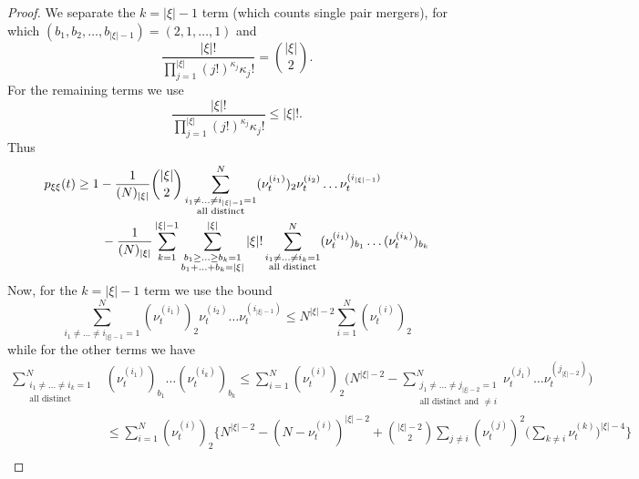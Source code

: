 \begin{proof}
We separate the $k=|\xi|-1$ term (which counts single pair mergers), for which $(b_1, b_2, \dots, b_{|\xi|-1}) = (2,1,\dots,1)$ and
\begin{equation*}
\frac{ | \xi |! }{ \prod_{ j = 1 }^{ | \xi | } ( j ! )^{ \kappa_j } \kappa_j ! }
= \binom{|\xi|}{2} .
\end{equation*}
For the remaining terms we use
\begin{equation*}
\frac{ | \xi |! }{ \prod_{ j = 1 }^{ | \xi | } ( j ! )^{ \kappa_j } \kappa_j ! }
\leq |\xi|! .
\end{equation*}
Thus
\begin{align}
p_{ \xi \xi }( t ) 
&\geq 1 - \frac{ 1 }{ ( N )_{ | \xi | } } \binom{|\xi|}{2}
        \sum_{ \substack{ i_1 \neq \ldots \neq i_{|\xi|-1} = 1 \\ \text{all distinct} } }^N 
        ( \nu_t^{ ( i_1 ) } )_2 \nu_t^{(i_2)} \ldots \nu_t^{ ( i_{|\xi|-1} ) } \notag\\
    &\qquad- \frac{ 1 }{ ( N )_{ | \xi | } } \sum_{ k = 1 }^{ | \xi | - 1 } 
        \sum_{ \substack{ b_1 \geq \ldots \geq b_k = 1 
        \\ b_1 + \ldots + b_k = | \xi | } }^{ | \xi | } |\xi|!
        \sum_{ \substack{ i_1 \neq \ldots \neq i_k = 1 \\ \text{all distinct} } }^N 
        ( \nu_t^{ ( i_1 ) } )_{ b_1 } \ldots ( \nu_t^{ ( i_k ) } )_{ b_k } \label{eq:pDeltaLB_1}
\end{align}
Now, for the $k=|\xi|-1$ term we use the bound
\begin{equation*}
\sum_{ i_1 \neq \ldots \neq i_{ | \xi | - 1 } = 1 }^N 
        ( \nu_t^{ ( i_1 ) } )_2 \nu_t^{ ( i_2 ) } \ldots \nu_t^{ ( i_{ | \xi | - 1 } ) }
\leq N^{ | \xi | - 2 } \sum_{ i = 1 }^N ( \nu_t^{ ( i ) } )_2
\end{equation*}
while for the other terms we have \parencite[similarly to][Lemma 1 Case 3]{koskela2018}
\begin{align*}
\sum_{ \substack{ i_1 \neq \ldots \neq i_k = 1 \\ \text{all distinct} } }^N &( \nu_t^{ ( i_1 ) } )_{ b_1 } \ldots ( \nu_t^{ ( i_k ) } )_{ b_k } \leq \sum_{ i = 1 }^N ( \nu_t^{ ( i ) } )_2 \Bigg( N^{ | \xi | - 2 } - \sum_{ \substack{ j_1 \neq \ldots \neq j_{ | \xi | - 2 } = 1 \\ \text{all distinct and } \neq i } }^N \nu_t^{ ( j_1 ) } \ldots \nu_t^{ ( j_{ | \xi | - 2 } ) } \Bigg) \\
&\leq \sum_{ i = 1 }^N ( \nu_t^{ ( i ) } )_2 \Bigg\{ N^{ | \xi | - 2 } - ( N - \nu_t^{ ( i ) } )^{ | \xi | - 2 } + \binom{ | \xi | - 2 }{ 2 } \sum_{ j \neq i } ( \nu_t^{ ( j ) } )^2 \Bigg( \sum_{ k \neq i } \nu_t^{ ( k ) } \Bigg)^{ | \xi | - 4 } \Bigg\} \\

\end{align*}
\end{proof}
